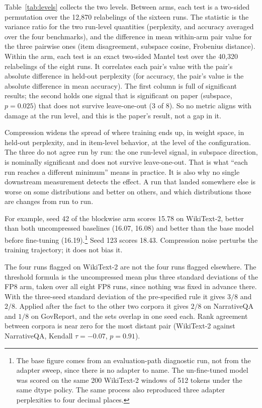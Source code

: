\documentclass[11pt,letterpaper]{article}
\begin{document}
Table~\ref{tab:levels} collects the two levels. Between arms, each test is a two-sided permutation over the 12{,}870 relabelings of the sixteen runs. The statistic is the variance ratio for the two run-level quantities (perplexity, and accuracy averaged over the four benchmarks), and the difference in mean within-arm pair value for the three pairwise ones (item disagreement, subspace cosine, Frobenius distance). Within the arm, each test is an exact two-sided Mantel test over the 40{,}320 relabelings of the eight runs. It correlates each pair's value with the pair's absolute difference in held-out perplexity (for accuracy, the pair's value is the absolute difference in mean accuracy). The first column is full of significant results; the second holds one signal that is significant on paper (subspace, $p = 0.025$) that does not survive leave-one-out (3 of 8). So no metric aligns with damage at the run level, and this is the paper's result, not a gap in it.

Compression widens the spread of where training ends up, in weight space, in held-out perplexity, and in item-level behavior, at the level of the configuration. The three do not agree run by run: the one run-level signal, in subspace direction, is nominally significant and does not survive leave-one-out. That is what ``each run reaches a different minimum'' means in practice. It is also why no single downstream measurement detects the effect. A run that landed somewhere else is worse on some distributions and better on others, and which distributions those are changes from run to run.

For example, seed 42 of the blockwise arm scores 15.78 on WikiText-2, better than both uncompressed baselines (16.07, 16.08) and better than the base model before fine-tuning (16.19).\footnote{The base figure comes from an evaluation-path diagnostic run, not from the adapter sweep, since there is no adapter to name. The un-fine-tuned model was scored on the same 200 WikiText-2 windows of 512 tokens under the same dtype policy. The same process also reproduced three adapter perplexities to four decimal places.} Seed 123 scores 18.43. Compression noise perturbs the training trajectory; it does not bias it.

\medskip
The four runs flagged on WikiText-2 are not the four runs flagged elsewhere. The threshold formula is the uncompressed mean plus three standard deviations of the FP8 arm, taken over all eight FP8 runs, since nothing was fixed in advance there. With the three-seed standard deviation of the pre-specified rule it gives $3/8$ and $2/8$. Applied after the fact to the other two corpora it gives $2/8$ on NarrativeQA and $1/8$ on GovReport, and the sets overlap in one seed each. Rank agreement between corpora is near zero for the most distant pair (WikiText-2 against NarrativeQA, Kendall $\tau = -0.07$, $p = 0.91$).
\end{document}
